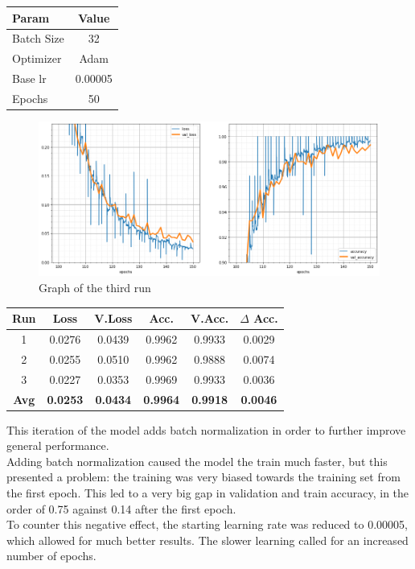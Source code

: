 \begin{table}[H]
	\centering
	\begin{tabular}{lc}
	\textbf{Param} & \textbf{Value}\\ \hline
	Batch Size 	& 32 \\
	Optimizer 	& Adam \\
	Base lr		& 0.00005 \\
	Epochs		& 50 \\
	\end{tabular}
\end{table}


\begin{figure}[H]
	\begin{center}
	\includegraphics[width=\linewidth]{Immagini/bn}
	\caption{Graph of the third run}
	\end{center}
\end{figure}
\begin{table}[H]
	\centering
	\begin{tabular}{cccccc}
		\textbf{Run} &\textbf{Loss}&\textbf{V.Loss} &\textbf{Acc.}&\textbf{V.Acc.}&\textbf{$\Delta$ Acc.} \\ \hline
	1   & 0.0276    & 0.0439    & 0.9962    & 0.9933    & 0.0029\\
	2   & 0.0255    & 0.0510    & 0.9962    & 0.9888    & 0.0074\\
	3   & 0.0227    & 0.0353    & 0.9969    & 0.9933    & 0.0036\\
	\textbf{Avg} & \textbf{0.0253}    & \textbf{0.0434}    & \textbf{0.9964}    & \textbf{0.9918}    & \textbf{0.0046}\\ 
	\end{tabular}
\end{table}

This iteration of the model adds batch normalization in order to further improve general performance.\\
Adding batch normalization caused the model the train much faster, but this presented a problem: the training was very biased towards the training set from the first epoch. This led to a very big gap in validation and train accuracy, in the order of 0.75 against 0.14 after the first epoch.\\
To counter this negative effect, the starting learning rate was reduced to 0.00005, which allowed for much better results. The slower learning called for an increased number of epochs.




